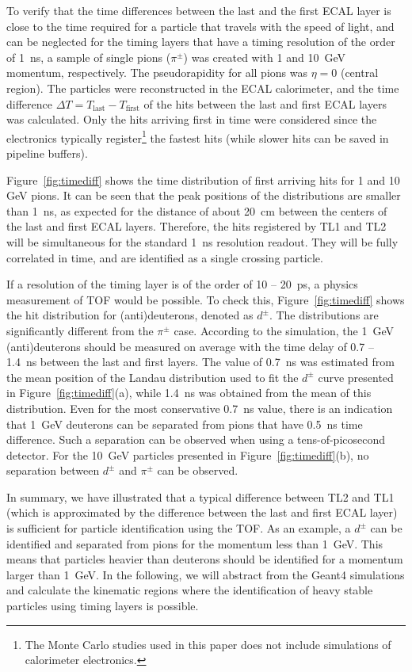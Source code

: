 \documentclass[final,1p,11pt]{elsarticle}
\begin{document}
To verify that the time differences between the last and the first ECAL layer is close to the time
required for a particle that travels with the speed of light, and can be neglected for the timing layers that
have a timing resolution of the order of 1~ns, a sample of single pions ($\pi^\pm$) was created with 1 and 10~GeV momentum, respectively. The
pseudorapidity for all pions was $\eta=0$ (central region). 
The particles were reconstructed in the ECAL calorimeter,
and the time difference $\Delta T= T_{\mathrm{last}}-T_{\mathrm{first}}$ of the hits between the last and first ECAL layers was calculated.
Only the hits arriving first in time were considered since the electronics typically register\footnote{The Monte Carlo studies used in this paper does not include
simulations of calorimeter electronics.} the fastest hits (while slower hits can be saved in pipeline buffers).

Figure~\ref{fig:timediff} shows the time distribution of first arriving hits 
for 1 and 10 GeV pions. It can be seen that the peak positions of the distributions are smaller
than 1~ns, as expected for the distance of about 20~cm between  the centers of the last and first ECAL layers.
Therefore, the hits registered by TL1 and TL2 will be simultaneous for the
standard 1~ns resolution readout. They will be fully correlated in time, and are identified as a single crossing particle.

If a resolution of the timing layer is of the order of 10 -- 20~ps, a physics measurement of TOF would be possible.
To check this, 
Figure~\ref{fig:timediff} shows the hit distribution for (anti)deuterons, denoted as $d^{\pm}$. 
The distributions are significantly different from the $\pi^{\pm}$ case. According to the simulation, the 1~GeV
(anti)deuterons should be measured on average with the time delay of 0.7 -- 1.4~ns between the last and first layers.
The value of 0.7~ns was estimated from the mean position of the Landau distribution used to fit the $d^{\pm}$ 
curve presented in Figure~\ref{fig:timediff}(a),
while 1.4~ns was obtained from the mean of this distribution. Even for the most conservative 0.7~ns value, there is an indication that 1~GeV
deuterons can be separated from pions that have 0.5~ns time difference. Such a separation can be observed when using a tens-of-picosecond detector.
For the 10~GeV particles presented in Figure~\ref{fig:timediff}(b), no separation between $d^{\pm}$ and $\pi^{\pm}$ can be observed.

In summary, we have illustrated that a typical difference between TL2 and TL1 (which is approximated by the difference
between the last and first ECAL layer) is sufficient for particle identification using the TOF.
As an example, a $d^{\pm}$ can be identified and separated from pions for the momentum less than 1~GeV.
This means that  particles heavier than deuterons should be identified for a momentum larger than 1~GeV.
In the following, we will abstract from the Geant4 simulations and calculate the kinematic regions  where the identification of heavy stable 
particles using timing layers is possible.
 
\end{document}
